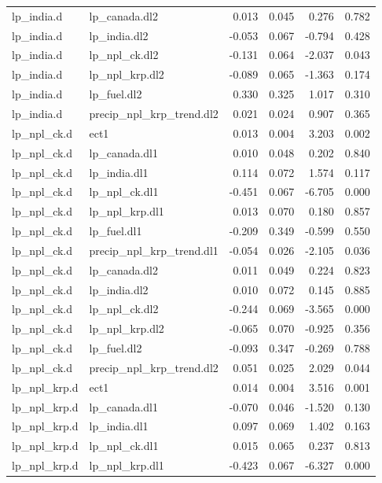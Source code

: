 \documentclass[12pt,]{article}
\begin{document}
\begin{longtable}[t]{llrrrr}
\addlinespace
lp\_india.d & lp\_canada.dl2 & 0.013 & 0.045 & 0.276 & 0.782\\
lp\_india.d & lp\_india.dl2 & -0.053 & 0.067 & -0.794 & 0.428\\
lp\_india.d & lp\_npl\_ck.dl2 & -0.131 & 0.064 & -2.037 & 0.043\\
lp\_india.d & lp\_npl\_krp.dl2 & -0.089 & 0.065 & -1.363 & 0.174\\
lp\_india.d & lp\_fuel.dl2 & 0.330 & 0.325 & 1.017 & 0.310\\
\addlinespace
lp\_india.d & precip\_npl\_krp\_trend.dl2 & 0.021 & 0.024 & 0.907 & 0.365\\
lp\_npl\_ck.d & ect1 & 0.013 & 0.004 & 3.203 & 0.002\\
lp\_npl\_ck.d & lp\_canada.dl1 & 0.010 & 0.048 & 0.202 & 0.840\\
lp\_npl\_ck.d & lp\_india.dl1 & 0.114 & 0.072 & 1.574 & 0.117\\
lp\_npl\_ck.d & lp\_npl\_ck.dl1 & -0.451 & 0.067 & -6.705 & 0.000\\
\addlinespace
lp\_npl\_ck.d & lp\_npl\_krp.dl1 & 0.013 & 0.070 & 0.180 & 0.857\\
lp\_npl\_ck.d & lp\_fuel.dl1 & -0.209 & 0.349 & -0.599 & 0.550\\
lp\_npl\_ck.d & precip\_npl\_krp\_trend.dl1 & -0.054 & 0.026 & -2.105 & 0.036\\
lp\_npl\_ck.d & lp\_canada.dl2 & 0.011 & 0.049 & 0.224 & 0.823\\
lp\_npl\_ck.d & lp\_india.dl2 & 0.010 & 0.072 & 0.145 & 0.885\\
\addlinespace
lp\_npl\_ck.d & lp\_npl\_ck.dl2 & -0.244 & 0.069 & -3.565 & 0.000\\
lp\_npl\_ck.d & lp\_npl\_krp.dl2 & -0.065 & 0.070 & -0.925 & 0.356\\
lp\_npl\_ck.d & lp\_fuel.dl2 & -0.093 & 0.347 & -0.269 & 0.788\\
lp\_npl\_ck.d & precip\_npl\_krp\_trend.dl2 & 0.051 & 0.025 & 2.029 & 0.044\\
lp\_npl\_krp.d & ect1 & 0.014 & 0.004 & 3.516 & 0.001\\
\addlinespace
lp\_npl\_krp.d & lp\_canada.dl1 & -0.070 & 0.046 & -1.520 & 0.130\\
lp\_npl\_krp.d & lp\_india.dl1 & 0.097 & 0.069 & 1.402 & 0.163\\
lp\_npl\_krp.d & lp\_npl\_ck.dl1 & 0.015 & 0.065 & 0.237 & 0.813\\
lp\_npl\_krp.d & lp\_npl\_krp.dl1 & -0.423 & 0.067 & -6.327 & 0.000\\

\end{longtable}
\end{document}
